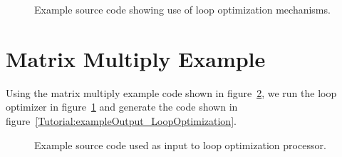 \begin{figure}[!h]
{\indent
{\mySmallFontSize


\begin{latexonly}
   
\end{latexonly}

\begin{htmlonly}
   
\end{htmlonly}

}
}
\caption{Example source code showing use of loop optimization mechanisms.}
\label{Tutorial:exampleLoopOptimization}
\end{figure}

\section{Matrix Multiply Example}

   Using the matrix multiply example code shown in 
figure~\ref{Tutorial:exampleInputCode_LoopOptimization}, we run the loop optimizer in
figure~\ref{Tutorial:exampleLoopOptimization} and generate the code shown in 
figure~\ref{Tutorial:exampleOutput_LoopOptimization}.

\begin{figure}[!h]
{\indent
{\mySmallFontSize


\begin{latexonly}
   
\end{latexonly}

\begin{htmlonly}
   
\end{htmlonly}

}
}
\caption{Example source code used as input to loop optimization processor.}
\label{Tutorial:exampleInputCode_LoopOptimization}
\end{figure}

